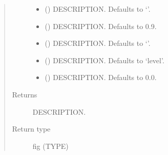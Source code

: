 \documentclass[letterpaper,10pt,english]{sphinxmanual}
\begin{document}
\begin{fulllineitems}
\begin{fulllineitems}
\begin{quote}
\begin{description}
\begin{itemize}
\item {} 
\sphinxAtStartPar
{} (\sphinxstyleliteralemphasis{\sphinxupquote{, }}) \textendash{} DESCRIPTION. Defaults to ‘’.

\item {} 
\sphinxAtStartPar
{} (\sphinxstyleliteralemphasis{\sphinxupquote{, }}) \textendash{} DESCRIPTION. Defaults to 0.9.

\item {} 
\sphinxAtStartPar
{} (\sphinxstyleliteralemphasis{\sphinxupquote{, }}) \textendash{} DESCRIPTION. Defaults to ‘’.

\item {} 
\sphinxAtStartPar
{} (\sphinxstyleliteralemphasis{\sphinxupquote{, }}) \textendash{} DESCRIPTION. Defaults to ‘level’.

\item {} 
\sphinxAtStartPar
{} (\sphinxstyleliteralemphasis{\sphinxupquote{, }}) \textendash{} DESCRIPTION. Defaults to 0.0.

\end{itemize}

\item[{Returns}] \leavevmode
\sphinxAtStartPar
DESCRIPTION.

\item[{Return type}] \leavevmode
\sphinxAtStartPar
fig (TYPE)

\end{description}\end{quote}

\end{fulllineitems}



\end{fulllineitems}
\end{document}
